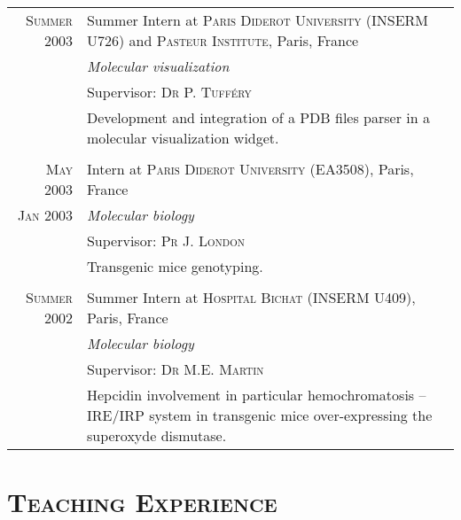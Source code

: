 \documentclass[a4paper,10pt]{article}
\begin{document}
\begin{longtable}{r|p{11cm}}
  \textsc{Summer 2003} & Summer Intern at \textsc{Paris Diderot University} (INSERM U726) and \textsc{Pasteur Institute}, Paris, France\\
  & \emph{Molecular visualization}\\
  & Supervisor: \textsc{Dr P. Tufféry}\\
  & \footnotesize{Development and integration of a PDB files parser in a molecular visualization widget.}\\
  \multicolumn{2}{c}{} \\

  \textsc{May 2003} & Intern at \textsc{Paris Diderot University} (EA3508), Paris, France\\
  \textsc{Jan 2003} & \emph{Molecular biology}\\
  & Supervisor: \textsc{Pr J. London}\\
  & \footnotesize{Transgenic mice genotyping.}\\
  \multicolumn{2}{c}{} \\

  \textsc{Summer 2002} & Summer Intern at \textsc{Hospital Bichat} (INSERM U409), Paris, France\\
  & \emph{Molecular biology}\\
  & Supervisor: \textsc{Dr M.E. Martin}\\
  & \footnotesize{Hepcidin involvement in particular hemochromatosis -- IRE/IRP system in transgenic mice over-expressing the superoxyde dismutase.}\\

\end{longtable}

\section{\textsc{Teaching Experience}}
\end{document}
